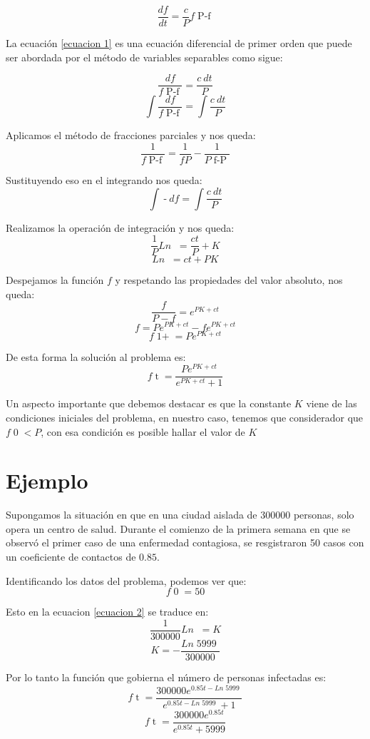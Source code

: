 \documentclass[12pt]{report}
\newcommand{\absgg}[1]{\mathop{\biggl| #1 \biggr|}}
\newcommand{\parg}[1]{\mathop{\big( #1 \big)}}
\newcommand{\parggg}[1]{\mathop{\Bigg( #1 \Bigg)}}
\begin{document}
\begin{equation}\label{ecuacion 1}
\frac{df}{dt}=\frac{c}{P} f\parg{P-f}
\end{equation}

La ecuación \ref{ecuacion 1} es una ecuación diferencial de primer orden que puede ser abordada por el método de variables separables como sigue:

$$\frac{df}{f\parg{P-f}}=\frac{c\ dt}{P}$$
$$\int\frac{df}{f\parg{P-f}}=\int\frac{c\ dt}{P}$$

Aplicamos el método de fracciones parciales y nos queda:
$$\frac{1}{f\parg{P-f}}=\frac{1}{f P}-\frac{1}{P\parg{f-P}}$$

Sustituyendo eso en el integrando nos queda:
$$\int\parggg{\frac{1}{f P}-\frac{1}{P\parg{f-P}}}df=\int\frac{c\ dt}{P}$$

Realizamos la operación de integración y nos queda:
$$\frac{1}{P} Ln\absgg{\frac{f}{f-P}}=\frac{ct}{P}+K$$
$$Ln\absgg{\frac{f}{f-P}}=ct+PK$$

Despejamos la función $f$ y respetando las propiedades del valor absoluto, nos queda:
$$\frac{f}{P-f}=e^{PK+ct}$$
$$f=Pe^{PK+ct}-fe^{PK+ct}$$
$$f\parg{1+e^{PK+ct}}=Pe^{PK+ct}$$

De esta forma la solución al problema es:
\begin{equation}\label{ecuacion 2}
f\parg{t}=\frac{Pe^{PK+ct}}{e^{PK+ct}+1}
\end{equation}

\newpage

Un aspecto importante que debemos destacar es que la constante $K$ viene de las condiciones iniciales del problema, en nuestro caso, tenemos que considerador que $f\parg{0}<P$, con esa condición es posible hallar el valor de $K$
\section{Ejemplo}
Supongamos la situación en que en una ciudad aislada de 300000 personas, solo opera un centro de salud. Durante el comienzo de la primera semana en que se observó el primer caso de una enfermedad contagiosa, se resgistraron 50 casos con un coeficiente de contactos de $0.85$.

Identificando los datos del problema, podemos ver que:
$$f\parg{0}=50$$

Esto en la ecuacion \ref{ecuacion 2} se traduce en:
$$\frac{1}{300000} Ln\absgg{\frac{50}{50-300000}}=K$$
$$K=-\frac{Ln\parg{5999}}{300000}$$

Por lo tanto la función que gobierna el número de personas infectadas es:
$$f\parg{t}=\frac{300000 e^{0.85t-Ln\parg{5999}}}{e^{0.85t-Ln\parg{5999}}+1}$$
$$f\parg{t}=\frac{300000 e^{0.85t}}{e^{0.85t}+5999}$$
\end{document}
